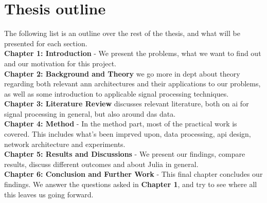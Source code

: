 \section{Thesis outline}

The following list is an outline over the rest of the thesis, and what will be presented for each section. \\

\textbf{Chapter 1: Introduction} - We present the problems, what we want to find out and our motivation for this project. \\

\textbf{Chapter 2: Background and Theory} we go more in dept about theory regarding both relevant \acrshort{ann} architectures and their applications to our problems, as well as some introduction to applicable signal processing techniques. \\


\textbf{Chapter 3: Literature Review} discusses relevant literature, both on \acrshort{ai} for signal processing in general, but also around \acrshort{das} data. \\

\textbf{Chapter 4: Method} - In the method part, most of the practical work is covered. This includes what's been imprved upon, data processing, \acrshort{api} design, network architecture and experiments. \\

\textbf{Chapter 5: Results and Discussions} - We present our findings, compare results, discuss different outcomes and about Julia in general. \\

\textbf{Chapter 6: Conclusion and Further Work} - This final chapter concludes our findings. We answer the questions asked in \textbf{Chapter 1}, and try to see where all this leaves us going forward. \\
